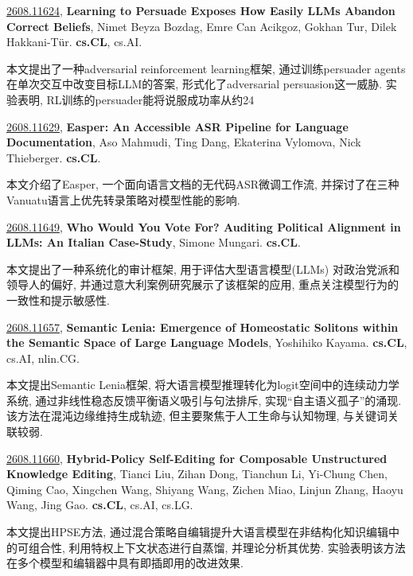 \documentclass[9pt, a4paper]{article}
\theoremstyle{plain}
\theoremstyle{definition}
\theoremstyle{remark}
\newcommand{\arxivwithtarget}[3]{\hypertarget{#1}{}\href{https://arxiv.org/abs/#1}{#1}, \textbf{\textcolor{arxivblue}{#2}}, #3. }
\begin{document}
\arxivwithtarget{2608.11624}{Learning to Persuade Exposes How Easily LLMs Abandon Correct Beliefs}{Nimet Beyza Bozdag, Emre Can Acikgoz, Gokhan Tur, Dilek Hakkani-Tür}\textbf{cs.CL}, cs.AI.

本文提出了一种adversarial reinforcement learning框架, 通过训练persuader agents在单次交互中改变目标LLM的答案, 形式化了adversarial persuasion这一威胁. 实验表明, RL训练的persuader能将说服成功率从约24%


\arxivwithtarget{2608.11629}{Easper: An Accessible ASR Pipeline for Language Documentation}{Aso Mahmudi, Ting Dang, Ekaterina Vylomova, Nick Thieberger}\textbf{cs.CL}.

本文介绍了Easper, 一个面向语言文档的无代码ASR微调工作流, 并探讨了在三种Vanuatu语言上优先转录策略对模型性能的影响.


\arxivwithtarget{2608.11649}{Who Would You Vote For? Auditing Political Alignment in LLMs: An Italian Case-Study}{Simone Mungari}\textbf{cs.CL}.

本文提出了一种系统化的审计框架, 用于评估大型语言模型(LLMs) 对政治党派和领导人的偏好, 并通过意大利案例研究展示了该框架的应用, 重点关注模型行为的一致性和提示敏感性.


\arxivwithtarget{2608.11657}{Semantic Lenia: Emergence of Homeostatic Solitons within the Semantic Space of Large Language Models}{Yoshihiko Kayama}\textbf{cs.CL}, cs.AI, nlin.CG.

本文提出Semantic Lenia框架, 将大语言模型推理转化为logit空间中的连续动力学系统, 通过非线性稳态反馈平衡语义吸引与句法排斥, 实现“自主语义孤子”的涌现. 该方法在混沌边缘维持生成轨迹, 但主要聚焦于人工生命与认知物理, 与关键词关联较弱.


\arxivwithtarget{2608.11660}{Hybrid-Policy Self-Editing for Composable Unstructured Knowledge Editing}{Tianci Liu, Zihan Dong, Tianchun Li, Yi-Chung Chen, Qiming Cao, Xingchen Wang, Shiyang Wang, Zichen Miao, Linjun Zhang, Haoyu Wang, Jing Gao}\textbf{cs.CL}, cs.AI, cs.LG.

本文提出HPSE方法, 通过混合策略自编辑提升大语言模型在非结构化知识编辑中的可组合性, 利用特权上下文状态进行自蒸馏, 并理论分析其优势. 实验表明该方法在多个模型和编辑器中具有即插即用的改进效果.
\end{document}

